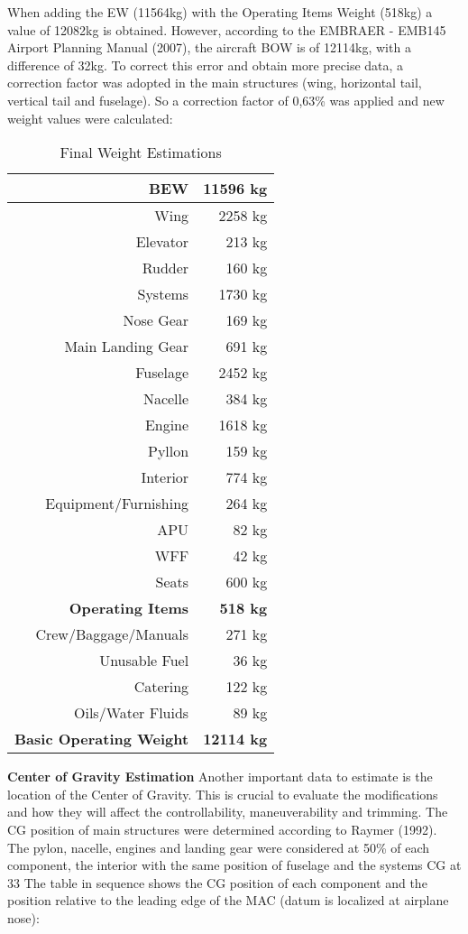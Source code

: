 When adding the EW (11564kg) with the Operating Items Weight (518kg) a value of 12082kg is obtained. However, according to the EMBRAER - EMB145 Airport Planning Manual (2007), the aircraft BOW is of 12114kg, with a difference of 32kg.
To correct this error and obtain more precise data, a correction factor was adopted in the main structures (wing, horizontal tail, vertical tail and fuselage). So a correction factor of 0,63\% was applied and new weight values were calculated:


\begin{table}[htbp]
  \centering
  \caption{Final Weight Estimations}
    \begin{tabular}{rr}
    \toprule
    \textbf{BEW} & \textbf{11596 kg} \\
    \midrule
    Wing  & 2258 kg \\
    Elevator & 213 kg \\
    Rudder & 160 kg \\
    Systems & 1730 kg \\
    Nose Gear & 169 kg \\
    Main Landing Gear & 691 kg \\
    Fuselage & 2452 kg \\
    Nacelle & 384 kg \\
    Engine & 1618 kg \\
    Pyllon & 159 kg \\
    Interior & 774 kg \\
    Equipment/Furnishing & 264 kg \\
    APU   & 82 kg \\
    WFF   & 42 kg \\
    Seats & 600 kg \\
    \textbf{Operating Items} & \textbf{518 kg} \\
    Crew/Baggage/Manuals & 271 kg \\
    Unusable Fuel & 36 kg \\
    Catering & 122 kg \\
    Oils/Water Fluids & 89 kg \\
    \textbf{Basic Operating Weight} & \textbf{12114 kg} \\
    \bottomrule
    \end{tabular}%
  \label{tab:finalweightestimations}%
\end{table}%


\textbf{Center of Gravity Estimation}
Another important data to estimate is the location of the Center of Gravity. This is crucial to evaluate the modifications and how they will affect the controllability, maneuverability and trimming.
The CG position of main structures were determined according to Raymer (1992). The pylon, nacelle, engines and landing gear were considered at 50\% of each component, the interior with the same position of fuselage and the systems CG at 33%
The table in sequence shows the CG position of each component and the position relative to the leading edge of the MAC (datum is localized at airplane nose):

